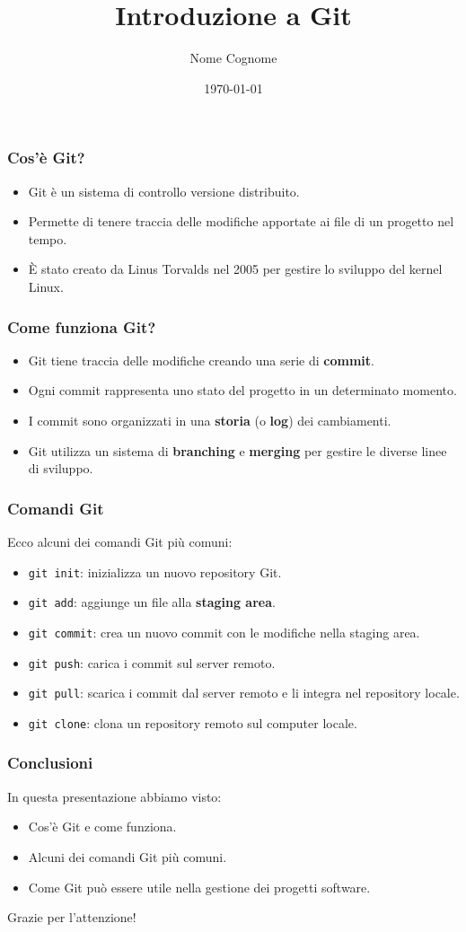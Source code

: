\documentclass{beamer}
\title{Introduzione a Git}
\author{Nome Cognome}
\institute{Università degli Studi di XYZ}
\date{\today}
\begin{document}
\begin{frame}
\titlepage
\end{frame}

\begin{frame}
\frametitle{Cos'è Git?}
\begin{itemize}
\item Git è un sistema di controllo versione distribuito.
\item Permette di tenere traccia delle modifiche apportate ai file di un progetto nel tempo.
\item È stato creato da Linus Torvalds nel 2005 per gestire lo sviluppo del kernel Linux.
\end{itemize}
\end{frame}

\begin{frame}
\frametitle{Come funziona Git?}
\begin{itemize}
\item Git tiene traccia delle modifiche creando una serie di \textbf{commit}.
\item Ogni commit rappresenta uno stato del progetto in un determinato momento.
\item I commit sono organizzati in una \textbf{storia} (o \textbf{log}) dei cambiamenti.
\item Git utilizza un sistema di \textbf{branching} e \textbf{merging} per gestire le diverse linee di sviluppo.
\end{itemize}
\end{frame}

\begin{frame}
\frametitle{Comandi Git}
Ecco alcuni dei comandi Git più comuni:
\begin{itemize}
\item \texttt{git init}: inizializza un nuovo repository Git.
\item \texttt{git add}: aggiunge un file alla \textbf{staging area}.
\item \texttt{git commit}: crea un nuovo commit con le modifiche nella staging area.
\item \texttt{git push}: carica i commit sul server remoto.
\item \texttt{git pull}: scarica i commit dal server remoto e li integra nel repository locale.
\item \texttt{git clone}: clona un repository remoto sul computer locale.
\end{itemize}
\end{frame}

\begin{frame}
\frametitle{Conclusioni}
In questa presentazione abbiamo visto:
\begin{itemize}
\item Cos'è Git e come funziona.
\item Alcuni dei comandi Git più comuni.
\item Come Git può essere utile nella gestione dei progetti software.
\end{itemize}
Grazie per l'attenzione!
\end{frame}
\end{document}
